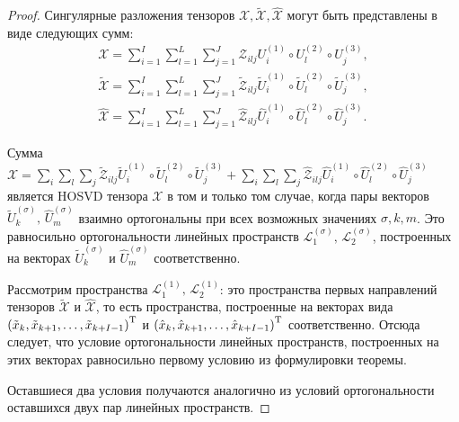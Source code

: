 \documentclass[specialist,
    substylefile = spbu.rtx,
    subf,href,colorlinks=true, 12pt]{disser}
\theoremstyle{plain}
\theoremstyle{definition}
\theoremstyle{remark}
\begin{document}
    \begin{proof}
        Сингулярные разложения тензоров $\mathcal{X}, \widetilde{\mathcal{X}}, \widehat{\mathcal{X}}$
        могут быть представлены в виде
        следующих сумм:
        \[
            \begin{aligned}
                \mathcal{X}=\sum_{i=1}^{I} \sum_{l=1}^{L} \sum_{j=1}^{J} \mathcal{Z}_{ilj} U^{(1)}_{i}
                \circ U^{(2)}_{l} \circ U^{(3)}_{j},\\
                \widetilde{\mathcal{X}}=\sum_{i=1}^{I} \sum_{l=1}^{L} \sum_{j=1}^{J} \widetilde{\mathcal{Z}}_{ilj}
                \widetilde{U}^{(1)}_{i} \circ \widetilde{U}^{(2)}_{l} \circ \widetilde{U}^{(3)}_{j},\\
                \widehat{\mathcal{X}}=\sum_{i=1}^{I} \sum_{l=1}^{L} \sum_{j=1}^{J} \widehat{\mathcal{Z}}_{ilj}
                \widehat{U}^{(1)}_{i} \circ \widehat{U}^{(2)}_{l} \circ \widehat{U}^{(3)}_{j}.
            \end{aligned}
        \]

        Сумма $\mathcal{X} = \sum_{i} \sum_{l} \sum_{j} \widetilde{\mathcal{Z}}_{ilj}
        \widetilde{U}^{(1)}_{i} \circ \widetilde{U}^{(2)}_{l} \circ \widetilde{U}^{(3)}_{j} +
        \sum_{i} \sum_{l} \sum_{j} \widehat{\mathcal{Z}}_{ilj} \widehat{U}^{(1)}_{i} \circ \widehat{U}^{(2)}_{l}
        \circ \widehat{U}^{(3)}_{j}$ является HOSVD тензора $\mathcal{X}$ в том и только том случае, когда
        пары векторов $\widetilde{U}^{(\sigma)}_{k},\, \widehat{U}^{(\sigma)}_{m}$ взаимно ортогональны
        при всех возможных значениях $\sigma, k, m$.
        Это равносильно ортогональности линейных пространств $\mathcal{L}^{(\sigma)}_{1},\, \mathcal{L}^{(\sigma)}_{2}$,
        построенных на векторах $\widetilde{U}^{(\sigma)}_{k}$ и $\widehat{U}^{(\sigma)}_{m}$ соответственно.

        Рассмотрим пространства $\mathcal{L}^{(1)}_{1},\, \mathcal{L}^{(1)}_{2}$: это пространства первых направлений
        тензоров $\widetilde{\mathcal{X}}$ и $\widehat{\mathcal{X}}$, то есть пространства, построенные на векторах вида $\left(\tilde{x}_k, \tilde{x}_{k+1}, \ldots, \tilde{x}_{k+I-1}\right)^{\mathrm{T}}$ и
        $\left(\hat{x}_k, \hat{x}_{k+1}, \ldots, \hat{x}_{k+I-1}\right)^{\mathrm{T}}$ соответственно.
        Отсюда следует, что условие ортогональности линейных пространств, построенных на этих векторах
        равносильно первому условию из формулировки теоремы.

        Оставшиеся два условия получаются аналогично из условий ортогональности оставшихся двух пар линейных пространств.
    \end{proof}
\end{document}
